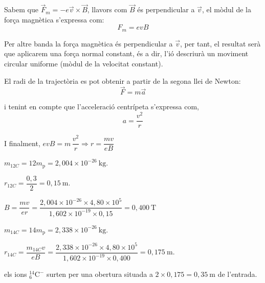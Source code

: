 \begin{solapartat}
 Sabem que $\vec{F}_m = -e\vec{v}\times\vec{B}$, llavors com $\vec{B}$ és perpendicular a $\vec{v}$, el mòdul de la força magnètica s'expressa com:
\[ F_m = evB \]

 Per altre banda la força magnètica és perpendicular a $\vec{v}$, per tant, el resultat serà que aplicarem una força normal constant, és a dir, l'ió descriurà un moviment circular uniforme (mòdul de la velocitat constant).

 El radi de la trajectòria es pot obtenir a partir de la segona llei de Newton:
\[ \vec{F} = m\vec{a} \]

 i tenint en compte que l'acceleració centrípeta s'expressa com,
\[ a = \frac{v^2}{r} \]

 I finalment, $evB = m\,\dfrac{v^2}{r} \Rightarrow r = \dfrac{mv}{eB}$
\end{solapartat}

\begin{solapartat}
 $m_{12C} = 12m_\mathrm{p} = 2,004\times 10^{-26}\ \mathrm{kg}$.

 $r_{12C} = \dfrac{0,3}{2} = 0,15\ \mathrm{m}$.

 $B = \dfrac{mv}{er} = \dfrac{2,004\times 10^{-26}\times 4,80\times 10^5}{1,602\times 10^{-19}\times 0,15} = 0,400\ \mathrm{T}$

 $m_{14C} = 14m_\mathrm{p} = 2,338\times 10^{-26}\ \mathrm{kg}$.

 $r_{14C} = \dfrac{m_{14C}v}{eB} = \dfrac{2,338\times 10^{-26}\times 4,80\times 10^5}{1,602\times 10^{-19}\times 0,400} = 0,175\ \mathrm{m}$.

 els ions $^{14}_{6}\mathrm{C}^-$ surten per una obertura situada a $2\times 0,175 = 0,35\ \mathrm{m}$ de l'entrada.
\end{solapartat}
